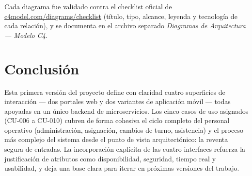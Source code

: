 Cada diagrama fue validado contra el checklist oficial de
\href{https://c4model.com/diagrams/checklist}{c4model.com/diagrams/checklist} (título, tipo,
alcance, leyenda y tecnología de cada relación), y se documenta en el archivo separado
\textit{Diagramas de Arquitectura --- Modelo C4}.

\section{Conclusión}

Esta primera versión del proyecto define con claridad cuatro superficies de interacción --- dos
portales web y dos variantes de aplicación móvil --- todas apoyadas en un único backend de
microservicios. Los cinco casos de uso asignados (CU-006 a CU-010) cubren de forma cohesiva el
ciclo completo del personal operativo (administración, asignación, cambios de turno, asistencia)
y el proceso más complejo del sistema desde el punto de vista arquitectónico: la reventa segura
de entradas. La incorporación explícita de las cuatro interfaces refuerza la justificación de
atributos como disponibilidad, seguridad, tiempo real y usabilidad, y deja una base clara para
iterar en próximas versiones del trabajo.


